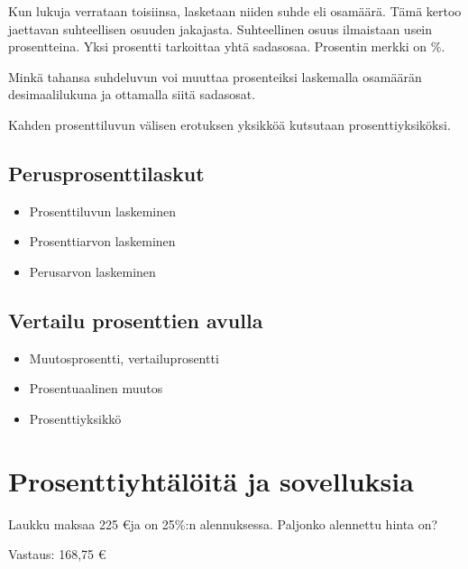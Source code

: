 Kun lukuja verrataan toisiinsa, lasketaan niiden suhde eli osamäärä. Tämä kertoo jaettavan suhteellisen osuuden jakajasta. Suhteellinen osuus ilmaistaan usein prosentteina. Yksi prosentti tarkoittaa yhtä sadasosaa. Prosentin merkki on $\%$.



Minkä tahansa suhdeluvun voi muuttaa prosenteiksi laskemalla osamäärän desimaalilukuna ja ottamalla siitä sadasosat.

Kahden prosenttiluvun välisen erotuksen yksikköä kutsutaan prosenttiyksiköksi.

\section{Perusprosenttilaskut}

\begin{itemize}
	\item Prosenttiluvun laskeminen
	\item Prosenttiarvon laskeminen
	\item Perusarvon laskeminen
\end{itemize}

\section{Vertailu prosenttien avulla}

\begin{itemize}
	\item Muutosprosentti, vertailuprosentti
	\item Prosentuaalinen muutos
	\item Prosenttiyksikkö
\end{itemize}

\chapter{Prosenttiyhtälöitä ja sovelluksia}

\begin{tehtava}
Laukku maksaa 225 \euro ja on 25\%:n alennuksessa. Paljonko alennettu hinta on?
\begin{vastaus}
Vastaus: 168,75 \euro
\end{vastaus}
\end{tehtava}

